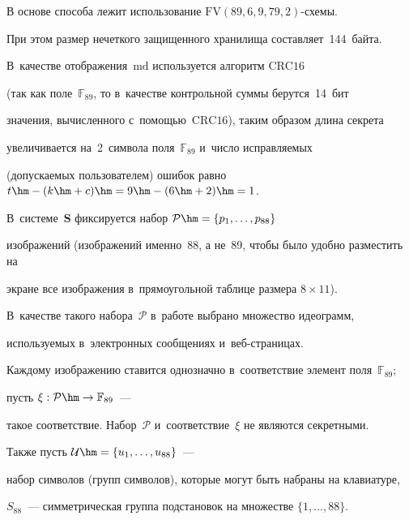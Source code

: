 В основе способа лежит использование $\mathrm{FV}(89,6,9,79,2)$-схе\-мы. 


При этом размер нечеткого защищенного хранилища составляет~144~байта. 


В~качестве отображения~$\mathrm{md}$ используется алгоритм $\mathrm{CRC16}$ 


(так как поле~$\mathbb{F}_{89}$, то в~качестве контрольной суммы берутся~14~бит 


значения, вычисленного с~по\-мощью~$\mathrm{CRC16}$), таким образом длина секрета 


увеличивается на~2~символа поля~$\mathbb{F}_{89}$ и~число ис\-прав\-ля\-емых 


(допускаемых пользователем) ошибок равно $t\hm-(k\hm+c)\hm=9\hm-(6\hm+2)\hm=1$.


В~системе~$\mathbf{S}$ фиксируется набор $\mathcal{P}\hm=\{p_1,\ldots,p_{88}\}$ 


изображений (изображений именно~88, а не~89, чтобы было удобно разместить на 


экране все изображения в~прямоугольной таблице размера $8\times 11$). 


В~качестве такого набора~$\mathcal{P}$ в~работе выбрано множество идеограмм, 


используемых в~электронных сообщениях и~веб-стра\-ни\-цах. 


Каждому изображению ставится однозначно в~соответствие элемент поля~$\mathbb{F}_{89}$; 


пусть $\xi:\mathcal{P}\hm\rightarrow \mathbb{F}_{89}$~--- 


такое соответствие. Набор~$\mathcal{P}$ и~соответствие~$\xi$ не являются секретными. 


Также пусть $\mathcal{U}\hm=\{u_1,\ldots,u_{88}\}$~--- 


набор символов (групп символов), которые могут быть набраны на клавиатуре, 


${S}_{88}$~--- симметрическая группа подстановок на множестве $\{1,\ldots,88\}$.





\pagebreak





\





\vspace*{-12pt}






